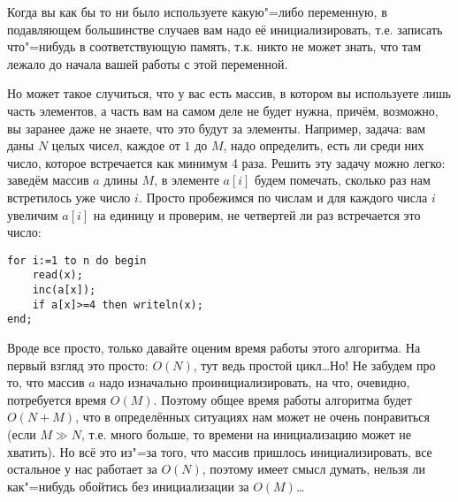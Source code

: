 Когда вы как бы то ни было используете какую"=либо переменную, в подавляющем большинстве случаев 
вам надо её инициализировать, т.е. записать что"=нибудь в соответствующую память, т.к. никто не 
может знать, что там лежало до начала вашей работы с этой переменной.


\pagebreak[2]

Но может такое случиться, что у вас есть массив, в котором вы используете лишь часть элементов, а 
часть вам на самом деле не будет нужна, причём, возможно, вы заранее даже не знаете, что это будут 
за элементы. Например, задача: вам даны $N$ целых чисел, каждое от $1$ до $M$, надо 
определить, есть ли среди них число, которое встречается как минимум 4 раза. Решить эту задачу можно легко: заведём массив $a$ 
длины $M$, в элементе $a[i]$ будем помечать, сколько раз нам встретилось уже число $i$. Просто пробежимся 
по числам и для каждого числа $i$ увеличим $a[i]$ на единицу и проверим, не четвертей ли 
раз встречается это число:
\begin{codesampleo}\begin{verbatim}
for i:=1 to n do begin
    read(x);
    inc(a[x]);
    if a[x]>=4 then writeln(x);
end;
\end{verbatim}
\end{codesampleo}

Вроде все просто, только давайте оценим время работы этого алгоритма. На первый взгляд это просто: 
$O(N)$, тут ведь простой цикл\dots Но! Не забудем про то, что массив $a$ надо изначально 
проинициализировать, на что, очевидно, потребуется время $O(M)$. Поэтому общее время работы 
алгоритма будет $O(N+M)$, что в определённых ситуациях нам может не очень понравиться (если $M\gg 
N$, т.е. много больше, то времени на инициализацию может не хватить). Но всё это из"=за 
того, что массив пришлось инициализировать, все остальное у нас работает за $O(N)$, поэтому имеет 
смысл думать, нельзя ли как"=нибудь обойтись без инициализации за $O(M)$\dots

